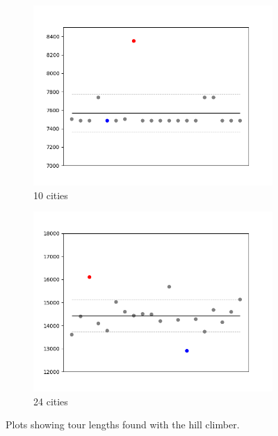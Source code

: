 \documentclass[a4paper]{article}
\begin{document}
\begin{figure}[h]
  \centering
  \begin{subfigure}[b]{0.48\textwidth}
    \includegraphics[width=\textwidth]{hill_climber_10.png}
    \caption{10 cities}\label{fig:hc10}
  \end{subfigure}
  \hfill
  \begin{subfigure}[b]{0.48\textwidth}
    \includegraphics[width=\textwidth]{hill_climber_24.png}
    \caption{24 cities}\label{fig:hc24}
  \end{subfigure}
  \caption{Plots showing tour lengths found with the hill climber.}
\end{figure}

\newpage
\end{document}
